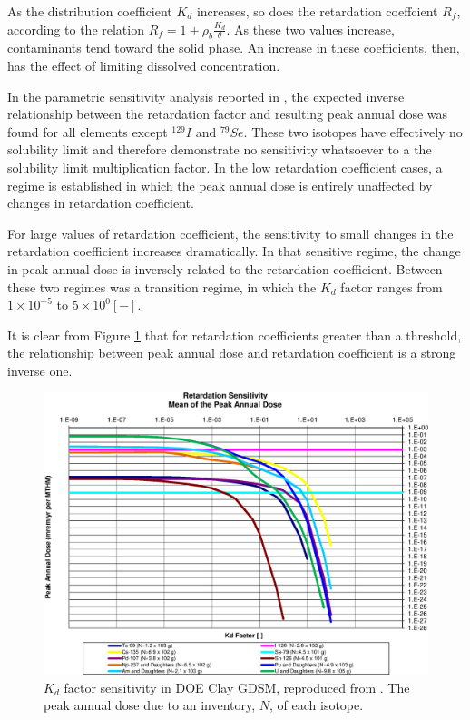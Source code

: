 

As the distribution coefficient $K_d$ increases, so does the retardation 
coeffcient $R_f$, according to the relation $R_f = 1+ \rho_b\frac{K_d}{\theta}$. As these two values increase, contaminants tend 
toward the solid phase. An increase in these coefficients, then, has the effect 
of limiting dissolved concentration.

In the parametric sensitivity analysis reported in \cite{huff_key_2012},
the expected inverse relationship between the retardation factor and resulting
peak annual dose was found for all elements except $^{129}I$ and $^{79}Se$. 
These two isotopes have effectively no solubility limit and therefore
demonstrate no sensitivity whatsoever to a the solubility limit multiplication 
factor. In the low retardation coefficient cases, a regime is established in 
which the peak annual dose is entirely unaffected by changes in retardation 
coefficient.

For large values of retardation coefficient, the sensitivity to small changes
in the retardation coefficient increases dramatically. In that sensitive
regime, the change in peak annual dose is inversely related to the retardation
coefficient. Between these two regimes was a transition regime, in which the
$K_d$ factor ranges from $1\times10^{-5}$ to $5\times10^{0} [-]$.

It is clear from Figure \ref{fig:KdSumFactor} that
for retardation coefficients greater than a threshold, the
relationship between peak annual dose and retardation coefficient is a strong
inverse one.

\begin{figure}[ht]
\centering
\includegraphics[width=0.7\linewidth]{./results/images/Retardation_Summary_kdFactor.eps}
\caption[$K_d$ factor sensitivity in Clay GDSM]{$K_d$ factor sensitivity in 
        DOE Clay GDSM, reproduced from \cite{huff_key_2012}.
The peak annual dose due to an inventory,
$N$, of each isotope.}
\label{fig:KdSumFactor}
\end{figure}

\FloatBarrier
